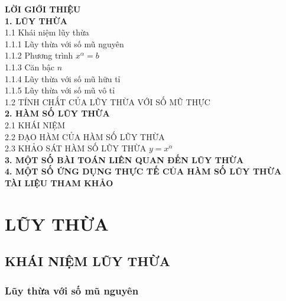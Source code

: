\documentclass{article}
\begin{document}
\noindent \textbf{LỜI GIỚI THIỆU}  \\
\noindent \textbf{1. LŨY THỪA}  \\
\hspace*{0.5cm} 1.1 Khái niệm lũy thừa   \\
\hspace*{1cm} 1.1.1 Lũy thừa với số mũ nguyên   \\
\hspace*{1cm} 1.1.2 Phương trình $x^{\alpha} = b$  \\
\hspace*{1cm} 1.1.3  Căn bậc $n$  \\
\hspace*{1cm} 1.1.4 Lũy thừa với số mũ hữu tỉ  \\
\hspace*{1cm} 1.1.5 Lũy thừa với số mũ vô tỉ  \\
\hspace*{0.5cm} 1.2 TÍNH CHẤT CỦA LŨY THỪA VỚI SỐ MŨ THỰC   \\
\noindent \textbf{2. HÀM SỐ LŨY THỪA}  \\
\hspace*{0.5cm} 2.1 KHÁI NIỆM  \\
\hspace*{0.5cm} 2.2   ĐẠO HÀM CỦA HÀM SỐ LŨY THỪA \\
\hspace*{0.5cm} 2.3 KHẢO SÁT HÀM SỐ LŨY THỪA $y=x^{\alpha}$  \\
\noindent \textbf{3. MỘT SỐ BÀI TOÁN LIÊN QUAN ĐẾN LŨY THỪA}  \\
\noindent \textbf{4. MỘT SỐ ỨNG DỤNG THỰC TẾ CỦA HÀM SỐ LŨY THỪA}  \\
\noindent \textbf{TÀI LIỆU THAM KHẢO} 
\newpage


\section{LŨY THỪA}
\subsection{KHÁI NIỆM LŨY THỪA}
\subsubsection{Lũy thừa với số mũ nguyên}
\end{document}
